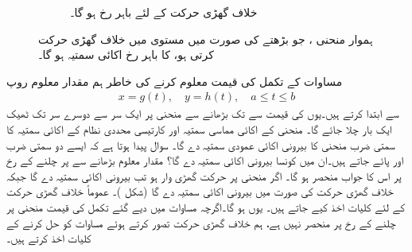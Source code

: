\begin{figure}
\begin{subfigure}{0.45\textwidth}
\caption{خلاف گھڑی حرکت کے لئے  باہر رخ ہو گا۔}
\end{subfigure}
\caption{
ہموار منحنی ، جو بڑھتے  کی صورت میں مستوی  میں  خلاف گھڑی حرکت کرتی ہو،  کا باہر رخ اکائی
 سمتیہ  ہو گا۔
}
\label{شکل_سمتی_تکمل_گھڑی_وار}
\end{figure}


مساوات  کے تکمل کی قیمت معلوم کرنے کی خاطر ہم مقدار معلوم روپ 
\begin{align*}
x=g(t),\quad y=h(t),\quad a\le t\le b
\end{align*}
سے ابتدا کرتے ہیں۔یوں  کی قیمت  سے   تک بڑھانے سے منحنی پر ایک سر سے دوسرے سر تک ٹھیک ایک بار چلا جائے گا۔ منحنی کے اکائی مماسی سمتیہ  اور کارتیسی محددی نظام کے اکائی سمتیہ  کا سمتی ضرب منحنی کا بیرونی اکائی عمودی سمتیہ  دے گا۔ سوال پیدا ہوتا ہے کہ ایسے دو سمتی ضرب  اور  پائے جاتے ہیں۔ان میں کونسا بیرونی اکائی سمتیہ دے گا؟ مقدار معلوم  بڑھانے سے  پر چلنے کے رخ پر اس کا جواب منحصر ہو گا۔ اگر منحنی پر حرکت گھڑی وار ہو تب  بیرونی اکائی سمتیہ دے گا جبکہ خلاف گھڑی حرکت کی صورت میں  بیرونی اکائی سمتیہ دے گا (شکل )۔ عموماً خلاف گھڑی حرکت کے لئے کلیات اخذ کیے جاتے ہیں۔ یوں   ہو گا۔اگرچہ مساوات  میں دیے گئے تکمل کی قیمت منحنی پر چلنے کے رخ پر منحصر نہیں ہے، ہم خلاف گھڑی حرکت تصور کرتے ہوئے   مساوات  کو حل کرنے کے کلیات اخذ کرتے ہیں۔ 

